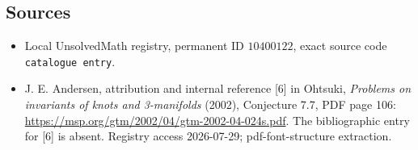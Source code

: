 \documentclass[11pt]{article}
\begin{document}
\subsection{Sources}
\begin{itemize}
\item Local UnsolvedMath registry, permanent ID \(10400122\), exact source code \texttt{catalogue entry}.
\item J. E. Andersen, attribution and internal reference [6] in Ohtsuki, \emph{Problems on invariants of knots and 3-manifolds} (2002), Conjecture 7.7, PDF page 106: \url{https://msp.org/gtm/2002/04/gtm-2002-04-024s.pdf}. The bibliographic entry for [6] is absent. Registry access 2026-07-29; pdf-font-structure extraction.
\end{itemize}
\end{document}
